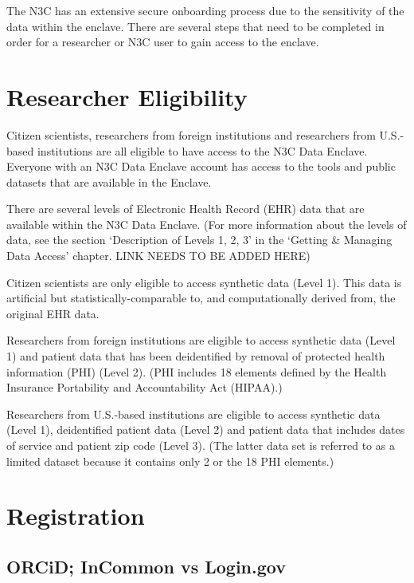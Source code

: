 \documentclass[
  letterpaper,
  DIV=11,
  numbers=noendperiod]{scrreprt}
\begin{document}
The N3C has an extensive secure onboarding process due to the
sensitivity of the data within the enclave. There are several steps that
need to be completed in order for a researcher or N3C user to gain
access to the enclave.

\hypertarget{researcher-eligibility}{%
\section{Researcher Eligibility}\label{researcher-eligibility}}

Citizen scientists, researchers from foreign institutions and
researchers from U.S.-based institutions are all eligible to have access
to the N3C Data Enclave. Everyone with an N3C Data Enclave account has
access to the tools and public datasets that are available in the
Enclave.

There are several levels of Electronic Health Record (EHR) data that are
available within the N3C Data Enclave. (For more information about the
levels of data, see the section `Description of Levels 1, 2, 3' in the
`Getting \& Managing Data Access' chapter. LINK NEEDS TO BE ADDED HERE)

Citizen scientists are only eligible to access synthetic data (Level 1).
This data is artificial but statistically-comparable to, and
computationally derived from, the original EHR data.

Researchers from foreign institutions are eligible to access synthetic
data (Level 1) and patient data that has been deidentified by removal of
protected health information (PHI) (Level 2). (PHI includes 18 elements
defined by the Health Insurance Portability and Accountability Act
(HIPAA).)

Researchers from U.S.-based institutions are eligible to access
synthetic data (Level 1), deidentified patient data (Level 2) and
patient data that includes dates of service and patient zip code (Level
3). (The latter data set is referred to as a limited dataset because it
contains only 2 or the 18 PHI elements.)

\hypertarget{registration}{%
\section{Registration}\label{registration}}

\hypertarget{orcid-incommon-vs-login.gov}{%
\subsection{ORCiD; InCommon vs
Login.gov}\label{orcid-incommon-vs-login.gov}}
\end{document}
